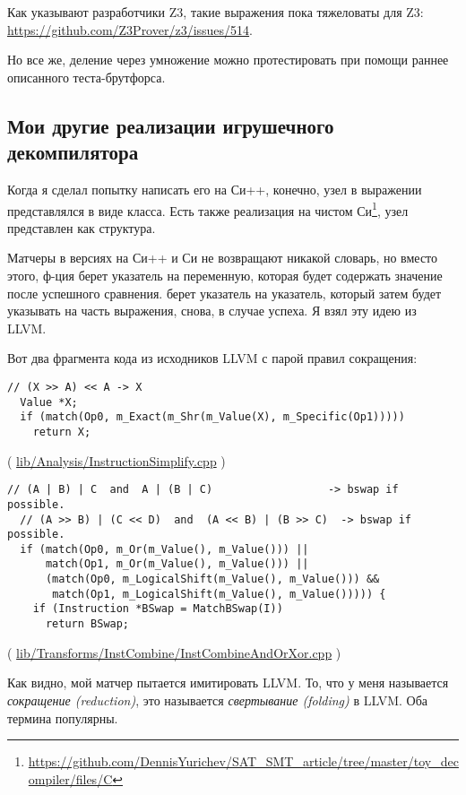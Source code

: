 Как указывают разработчики Z3, такие выражения пока тяжеловаты для Z3:
\url{https://github.com/Z3Prover/z3/issues/514}.

Но все же, деление через умножение можно протестировать при помощи раннее описанного теста-брутфорса.

\subsection{Мои другие реализации игрушечного декомпилятора}

Когда я сделал попытку написать его на Си++, конечно, узел в выражении представлялся в виде класса.
Есть также реализация на чистом Си\footnote{\url{https://github.com/DennisYurichev/SAT_SMT_article/tree/master/toy_decompiler/files/C}}, узел представлен как структура.

Матчеры в версиях на Си++ и Си не возвращают никакой словарь, но вместо этого, ф-ция 
берет указатель на переменную, которая будет содержать значение после успешного сравнения.
 берет указатель на указатель, который затем будет указывать на часть выражения, снова, в случае успеха.
Я взял эту идею из LLVM.

Вот два фрагмента кода из исходников LLVM с парой правил сокращения:

\begin{lstlisting}
// (X >> A) << A -> X
  Value *X;
  if (match(Op0, m_Exact(m_Shr(m_Value(X), m_Specific(Op1)))))
    return X;
\end{lstlisting}

( \href{http://llvm.org/docs/doxygen/html/InstructionSimplify_8cpp_source.html}{lib/Analysis/InstructionSimplify.cpp} )

\begin{lstlisting}
// (A | B) | C  and  A | (B | C)                  -> bswap if possible.
  // (A >> B) | (C << D)  and  (A << B) | (B >> C)  -> bswap if possible.
  if (match(Op0, m_Or(m_Value(), m_Value())) ||
      match(Op1, m_Or(m_Value(), m_Value())) ||
      (match(Op0, m_LogicalShift(m_Value(), m_Value())) &&
       match(Op1, m_LogicalShift(m_Value(), m_Value())))) {
    if (Instruction *BSwap = MatchBSwap(I))
      return BSwap;
\end{lstlisting}
( \href{https://github.com/numba/llvm-mirror/blob/master/lib/Transforms/InstCombine/InstCombineAndOrXor.cpp}{lib/Transforms/InstCombine/InstCombineAndOrXor.cpp} )

Как видно, мой матчер пытается имитировать LLVM.
То, что у меня называется \textit{сокращение (reduction)}, это называется \textit{свертывание (folding)} в LLVM.
Оба термина популярны.

